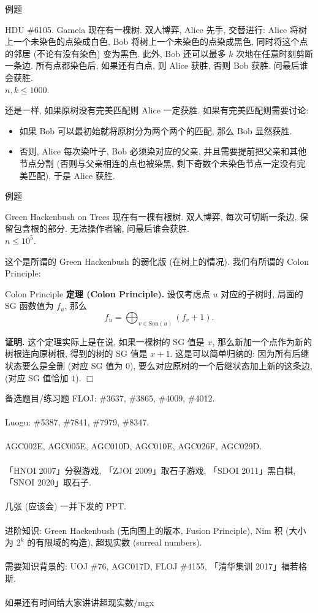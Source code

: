 \documentclass{beamer}
\newcommand{\nl}{\\\hspace*{\fill}\\}
\begin{document}
	\begin{frame}{例题}
		\begin{block}{HDU \#6105. Gameia}
			现在有一棵树. 双人博弈, Alice 先手, 交替进行: Alice 将树上一个未染色的点染成白色, Bob 将树上一个未染色的点染成黑色, 同时将这个点的邻居 (不论有没有染色) 变为黑色. 此外, Bob 还可以最多 $k$ 次地在任意时刻剪断一条边. 所有点都染色后, 如果还有白点, 则 Alice 获胜, 否则 Bob 获胜. 问最后谁会获胜.\\
			$n,k\leq 1000$.
		\end{block}
		\pause
		还是一样, 如果原树没有完美匹配则 Alice 一定获胜. 如果有完美匹配则需要讨论:
		\begin{itemize}
			\item 如果 Bob 可以最初始就将原树分为两个两个的匹配, 那么 Bob 显然获胜.\\
			\item 否则, Alice 每次染叶子, Bob 必须染对应的父亲, 并且需要提前把父亲和其他节点分割 (否则与父亲相连的点也被染黑, 剩下奇数个未染色节点一定没有完美匹配), 于是 Alice 获胜.
		\end{itemize}
	\end{frame}

	\begin{frame}{例题}
		\begin{block}{Green Hackenbush on Trees}
			现在有一棵有根树. 双人博弈, 每次可切断一条边, 保留包含根的部分. 无法操作者输, 问最后谁会获胜.\\
			$n\leq 10^5$.
		\end{block}
		\pause
		这个是所谓的 Green Hackenbush 的弱化版 (在树上的情况). 我们有所谓的 Colon Principle:
		\begin{block}{Colon Principle}
			\textbf{定理 (Colon Principle).} 设仅考虑点 $u$ 对应的子树时, 局面的 SG 函数值为 $f_u$, 那么
			$$
			f_u=\bigoplus_{v\in\text{Son}(u)}(f_v+1).
			$$
		\end{block}
		\textbf{证明.} 这个定理实际上是在说, 如果一棵树的 SG 值是 $x$, 那么新加一个点作为新的树根连向原树根, 得到的树的 SG 值是 $x+1$. 这是可以简单归纳的: 因为所有后继状态要么是全删 (对应 SG 值为 $0$), 要么对应原树的一个后继状态加上新的这条边, (对应 SG 值恰加 $1$). $\Box$
	\end{frame}

	\begin{frame}{备选题目/练习题}
		FLOJ: \#3637, \#3865, \#4009, \#4012.\nl
		Luogu: \#5387, \#7841, \#7979, \#8347.\nl
		AGC002E, AGC005E, AGC010D, AGC010E, AGC026F, AGC029D.\nl
		「HNOI 2007」分裂游戏, 「ZJOI 2009」取石子游戏, 「SDOI 2011」黑白棋, 「SNOI 2020」取石子.\nl
		几张 (应该会) 一并下发的 PPT.\nl
		进阶知识: Green Hackenbush (无向图上的版本, Fusion Principle), Nim 积 (大小为 $2^k$ 的有限域的构造), 超现实数 (surreal numbers).\nl
		需要知识背景的: UOJ \#76, AGC017D, FLOJ \#4155, 「清华集训 2017」福若格斯.\nl
		如果还有时间给大家讲讲超现实数/mgx
	\end{frame}
\end{document}
